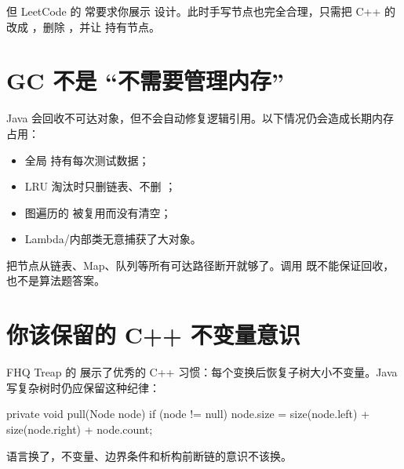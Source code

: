 但 LeetCode 的  常要求你展示  设计。此时手写节点也完全合理，只需把 C++ 的  改成 ，删除 ，并让  持有节点。

\section{GC 不是 ``不需要管理内存''}

Java 会回收不可达对象，但不会自动修复逻辑引用。以下情况仍会造成长期内存占用：
\begin{itemize}
  \item 全局  持有每次测试数据；
  \item LRU 淘汰时只删链表、不删 ；
  \item 图遍历的  被复用而没有清空；
  \item Lambda/内部类无意捕获了大对象。
\end{itemize}

\begin{pitfall}
把节点从链表、Map、队列等所有可达路径断开就够了。调用  既不能保证回收，也不是算法题答案。
\end{pitfall}

\section{你该保留的 C++ 不变量意识}

FHQ Treap 的  展示了优秀的 C++ 习惯：每个变换后恢复子树大小不变量。Java 写复杂树时仍应保留这种纪律：

\begin{javacode}
private void pull(Node node) {
    if (node != null) {
        node.size = size(node.left) + size(node.right) + node.count;
    }
}
\end{javacode}

语言换了，不变量、边界条件和析构前断链的意识不该换。
